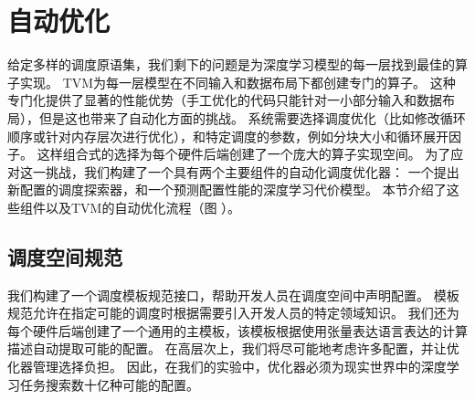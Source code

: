 \section{自动优化}
\label{automating}
给定多样的调度原语集，我们剩下的问题是为深度学习模型的每一层找到最佳的算子实现。
TVM为每一层模型在不同输入和数据布局下都创建专门的算子。
这种专门化提供了显著的性能优势（手工优化的代码只能针对一小部分输入和数据布局），但是这也带来了自动化方面的挑战。
系统需要选择调度优化（比如修改循环顺序或针对内存层次进行优化），和特定调度的参数，例如分块大小和循环展开因子。
这样组合式的选择为每个硬件后端创建了一个庞大的算子实现空间。
为了应对这一挑战，我们构建了一个具有两个主要组件的自动化调度优化器：
一个提出新配置的调度探索器，和一个预测配置性能的深度学习代价模型。
本节介绍了这些组件以及TVM的自动优化流程（图 ）。

\subsection{调度空间规范}
我们构建了一个调度模板规范接口，帮助开发人员在调度空间中声明配置。 
模板规范允许在指定可能的调度时根据需要引入开发人员的特定领域知识。
我们还为每个硬件后端创建了一个通用的主模板，该模板根据使用张量表达语言表达的计算描述自动提取可能的配置。
在高层次上，我们将尽可能地考虑许多配置，并让优化器管理选择负担。
因此，在我们的实验中，优化器必须为现实世界中的深度学习任务搜索数十亿种可能的配置。


